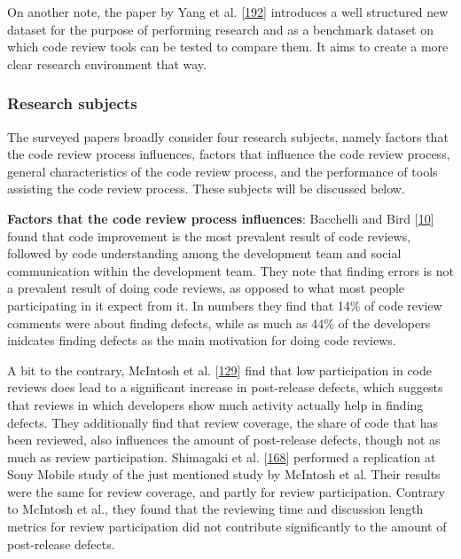 \documentclass[]{book}
\begin{document}
On another note, the paper by Yang et al.
{[}\protect\hyperlink{ref-yang2016mining}{192}{]} introduces a well
structured new dataset for the purpose of performing research and as a
benchmark dataset on which code review tools can be tested to compare
them. It aims to create a more clear research environment that way.

\subsubsection{Research subjects}\label{research-subjects}

The surveyed papers broadly consider four research subjects, namely
factors that the code review process influences, factors that influence
the code review process, general characteristics of the code review
process, and the performance of tools assisting the code review process.
These subjects will be discussed below.

\textbf{Factors that the code review process influences}: Bacchelli and
Bird {[}\protect\hyperlink{ref-bacchelli2013expectations}{10}{]} found
that code improvement is the most prevalent result of code reviews,
followed by code understanding among the development team and social
communication within the development team. They note that finding errors
is not a prevalent result of doing code reviews, as opposed to what most
people participating in it expect from it. In numbers they find that
14\% of code review comments were about finding defects, while as much
as 44\% of the developers inidcates finding defects as the main
motivation for doing code reviews.

A bit to the contrary, McIntosh et al.
{[}\protect\hyperlink{ref-mcintosh2014impact}{129}{]} find that low
participation in code reviews does lead to a significant increase in
post-release defects, which suggests that reviews in which developers
show much activity actually help in finding defects. They additionally
find that review coverage, the share of code that has been reviewed,
also influences the amount of post-release defects, though not as much
as review participation. Shimagaki et al.
{[}\protect\hyperlink{ref-shimagaki2016study}{168}{]} performed a
replication at Sony Mobile study of the just mentioned study by McIntosh
et al. Their results were the same for review coverage, and partly for
review participation. Contrary to McIntosh et al., they found that the
reviewing time and discussion length metrics for review participation
did not contribute significantly to the amount of post-release defects.
\end{document}
